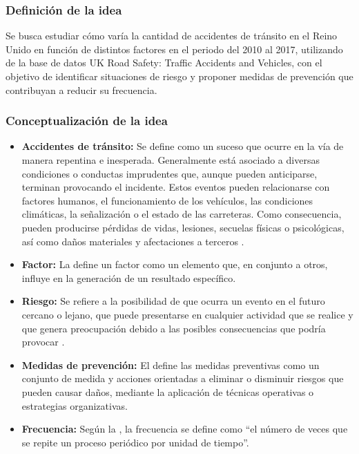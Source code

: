 \documentclass[12pt]{article}
\begin{document}
\subsubsection{Definición de la idea}
Se busca estudiar cómo varía la cantidad de accidentes de tránsito en el Reino Unido en función de distintos factores en el periodo del 2010 al 2017, utilizando de la base de datos UK Road Safety: Traffic Accidents and Vehicles, con el objetivo de identificar situaciones de riesgo y proponer medidas de prevención que contribuyan a reducir su frecuencia. 

\subsubsection{Conceptualización de la idea}
\begin{itemize}
    \item \textbf{Accidentes de tránsito:} Se define como un suceso que ocurre en la vía de manera repentina e inesperada. Generalmente está asociado a diversas condiciones o conductas imprudentes que, aunque pueden anticiparse, terminan provocando el incidente. Estos eventos pueden relacionarse con factores humanos, el funcionamiento de los vehículos, las condiciones climáticas, la señalización o el estado de las carreteras. Como consecuencia, pueden producirse pérdidas de vidas, lesiones, secuelas físicas o psicológicas, así como daños materiales y afectaciones a terceros \parencite{accidentes_transito_inec}. 
    
    \item \textbf{Factor:} La \textcite{factor_rae} define un factor como un elemento que, en conjunto a otros, influye en la generación de un resultado específico. 

    \item \textbf{Riesgo:} Se refiere a la posibilidad de que ocurra un evento en el futuro cercano o lejano, que puede presentarse en cualquier actividad que se realice y que genera preocupación debido a las posibles consecuencias que podría provocar \parencite{riesgo_mapfre}.  

    \item \textbf{Medidas de prevención:} El \textcite{medidas_prevencion_pj} define las medidas preventivas como un conjunto de medida y acciones orientadas a eliminar o disminuir riesgos que pueden causar daños, mediante la aplicación de técnicas operativas o estrategias organizativas.  
    
    \item \textbf{Frecuencia:} Según la \textcite{frecuencia}, la frecuencia se define como “el número de veces que se repite un proceso periódico por unidad de tiempo”. 
    

\end{itemize}
\end{document}
